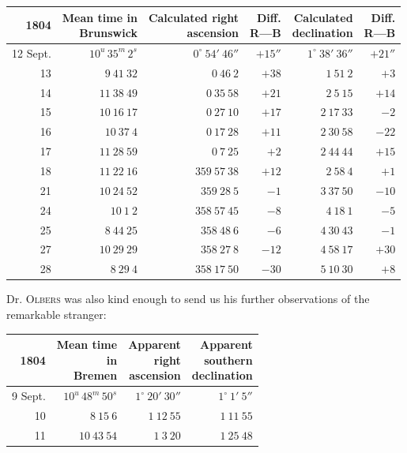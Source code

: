\begin{center}
\begingroup\fontsize{8}{10}\selectfont\setlength{\tabcolsep}{3pt}\renewcommand{\arraystretch}{1.12}
\begin{tabular}{r|r|r|r|r|r}
1804 & \shortstack{Mean time in\\Brunswick} & \shortstack{Calculated right\\ascension} & \shortstack{Diff.\\R—B} & \shortstack{Calculated\\declination} & \shortstack{Diff.\\R—B} \\ \hline
12 Sept. & $10^{u}\,35^{m}\,2^{s}$ & $0^\circ\ 54'\ 46''$ & $+15''$ & $1^\circ\ 38'\ 36''$ & $+21''$ \\
13 & $9\ 41\ 32$ & $0\ 46\ 2$ & $+38$ & $1\ 51\ 2$ & $+3$ \\
14 & $11\ 38\ 49$ & $0\ 35\ 58$ & $+21$ & $2\ 5\ 15$ & $+14$ \\
15 & $10\ 16\ 17$ & $0\ 27\ 10$ & $+17$ & $2\ 17\ 33$ & $-2$ \\
16 & $10\ 37\ 4$ & $0\ 17\ 28$ & $+11$ & $2\ 30\ 58$ & $-22$ \\
17 & $11\ 28\ 59$ & $0\ 7\ 25$ & $+2$ & $2\ 44\ 44$ & $+15$ \\
18 & $11\ 22\ 16$ & $359\ 57\ 38$ & $+12$ & $2\ 58\ 4$ & $+1$ \\
21 & $10\ 24\ 52$ & $359\ 28\ 5$ & $-1$ & $3\ 37\ 50$ & $-10$ \\
24 & $10\ 1\ 2$ & $358\ 57\ 45$ & $-8$ & $4\ 18\ 1$ & $-5$ \\
25 & $8\ 44\ 25$ & $358\ 48\ 6$ & $-6$ & $4\ 30\ 43$ & $-1$ \\
27 & $10\ 29\ 29$ & $358\ 27\ 8$ & $-12$ & $4\ 58\ 17$ & $+30$ \\
28 & $8\ 29\ 4$ & $358\ 17\ 50$ & $-30$ & $5\ 10\ 30$ & $+8$ \\
\end{tabular}\endgroup
\end{center}

Dr. \textsc{Olbers} was also kind enough to send us his further observations of the remarkable stranger:

\begin{center}
\begingroup\fontsize{9}{11}\selectfont\setlength{\tabcolsep}{3pt}\renewcommand{\arraystretch}{1.12}
\begin{tabular}{r|r|r|r}
1804 & \shortstack{Mean time\\in\\Bremen} & \shortstack{Apparent\\right\\ascension} & \shortstack{Apparent\\southern\\declination} \\ \hline
9 Sept. & $10^{u}\,48^{m}\,50^{s}$ & $1^\circ\ 20'\ 30''$ & $1^\circ\ 1'\ 5''$ \\
10 & $8\ 15\ 6$ & $1\ 12\ 55$ & $1\ 11\ 55$ \\
11 & $10\ 43\ 54$ & $1\ 3\ 20$ & $1\ 25\ 48$ \\
\end{tabular}\endgroup
\end{center}

